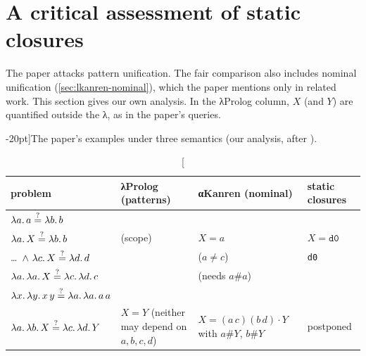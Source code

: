 \section{A critical assessment of static closures}\label{sec:lkanren-assess}

The paper attacks pattern unification. The fair comparison also includes nominal unification
(\cref{sec:lkanren-nominal}), which the paper mentions only in related work. This section gives our own
analysis. In the λProlog column, $X$ (and $Y$) are quantified outside the λ, as in the paper's
queries.

\begin{table}[ht]
\small
\caption[][-20pt]{The paper's examples under three semantics (our analysis, after \cite{MaFriedman2021}).}
\label{tab:lkanren-three}
\begin{tabularx}{\linewidth}{>{\raggedright\arraybackslash}p{4.1cm}>{\raggedright\arraybackslash}X>{\raggedright\arraybackslash}X>{\raggedright\arraybackslash}X}
\toprule
problem & λProlog (patterns) & αKanren (nominal) & static closures\\
\midrule
$\lambda a.\,a\stackrel{?}{=}\lambda b.\,b$ & \lkyes{} & \lkyes{} & \lkyes{}\\
$\lambda a.\,X\stackrel{?}{=}\lambda b.\,b$ & \lkno{} (scope) & \lkyes{} $X=a$ & \lkyes{} $X=\texttt{d0}$\\
\dots\ $\wedge\ \abs{c}{X}\lkq\abs{d}{d}$ & \lkno{} & \lkno{} ($a\neq c$) & \lkyes{} \texttt{d0}\\
$\lambda a.\,\lambda a.\,X\stackrel{?}{=}\lambda c.\,\lambda d.\,c$ & \lkno{} & \lkno{} (needs $a\#a$) & \lkno{}\\
$\lambda x.\,\lambda y.\,x\,y\stackrel{?}{=}\lambda a.\,\lambda a.\,a\,a$ & \lkno{} & \lkno{} & \lkno{}\\
$\lambda a.\,\lambda b.\,X\stackrel{?}{=}\lambda c.\,\lambda d.\,Y$ & \lkyes{} $X=Y$ (neither may depend on $a,b,c,d$) &
  $X=(a\,c)(b\,d)\cdot Y$ with $a\#Y$, $b\#Y$ & postponed\\
\bottomrule
\end{tabularx}\par
\vspace{30pt}%
\end{table}

